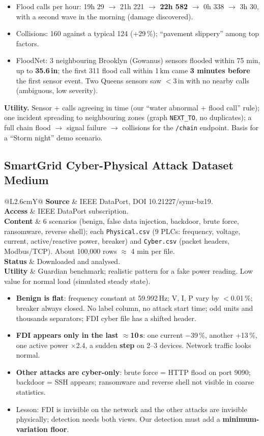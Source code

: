 \documentclass[10pt,a4paper]{article}
\makeatletter
\newcommand{\code}[1]{\texttt{#1}}
\newcommand{\MED}{\textbf{\textcolor{med}{Medium}}}
\newcommand{\facts}[5]{%
\noindent\begin{tabularx}{\textwidth}{@{}L{2.6cm}Y@{}}
\textbf{Source} & #1\\
\textbf{Access} & #2\\
\textbf{Content} & #3\\
\textbf{Status} & #4\\
\textbf{Utility} & #5\\
\end{tabularx}\par\smallskip}
\makeatother
\begin{document}
\begin{itemize}
\item Flood calls per hour: 19h 29 $\rightarrow$ 21h 221 $\rightarrow$ \textbf{22h 582} $\rightarrow$ 0h 338 $\rightarrow$ 3h 30, with a second wave in the morning (damage discovered).
\item Collisions: 160 against a typical 124 (+29\,\%); ``pavement slippery'' among top factors.
\item FloodNet: 3 neighbouring Brooklyn (Gowanus) sensors flooded within 75 min, up to \textbf{35.6\,in}; the first 311 flood call within 1\,km came \textbf{3 minutes before} the first sensor event. Two Queens sensors saw $<$3\,in with no nearby calls (ambiguous, low severity).
\end{itemize}

\textbf{Utility.} Sensor + calls agreeing in time (our ``water abnormal + flood call'' rule); one incident spreading to neighbouring zones (graph \code{NEXT\_TO}, no duplicates); a full chain flood $\rightarrow$ signal failure $\rightarrow$ collisions for the \code{/chain} endpoint. Basis for a ``Storm night'' demo scenario.

\subsection{SmartGrid Cyber-Physical Attack Dataset \hfill \MED}
\facts{IEEE DataPort, DOI 10.21227/symr-bz19.}
{IEEE DataPort subscription.}
{6 scenarios (benign, false data injection, backdoor, brute force, ransomware, reverse shell); each \code{Physical.csv} (9 PLCs: frequency, voltage, current, active/reactive power, breaker) and \code{Cyber.csv} (packet headers, Modbus/TCP). About 100,000 rows $\approx$ 4 min per file.}
{Downloaded and analysed.}
{Guardian benchmark; realistic pattern for a fake power reading. Low value for normal load (simulated steady state).}

\begin{itemize}
\item \textbf{Benign is flat}: frequency constant at 59.992\,Hz; V, I, P vary by $<$0.01\,\%; breaker always closed. No label column, no attack start time; odd units and thousands separators; FDI cyber file has a shifted header.
\item \textbf{FDI appears only in the last $\approx$10\,s}: one current $-$39\,\%, another +13\,\%, one active power $\times$2.4, a sudden \textbf{step} on 2--3 devices. Network traffic looks normal.
\item \textbf{Other attacks are cyber-only}: brute force = HTTP flood on port 9090; backdoor = SSH appears; ransomware and reverse shell not visible in coarse statistics.
\item Lesson: FDI is invisible on the network and the other attacks are invisible physically; detection needs both views. Our detection must add a \textbf{minimum-variation floor}.
\end{itemize}
\end{document}
